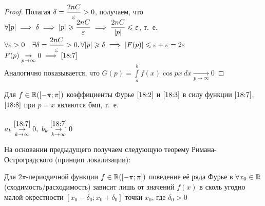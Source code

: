 \documentclass[../../main.tex]{subfiles}
\begin{document}
\begin{proof}
	Полагая $\delta = \dfrac{2nC}{\varepsilon	} > 0$, получаем, что
	$\forall |p| \implies \delta \implies |p| \geqslant
	\dfrac{2nC}{\varepsilon} \implies \dfrac{2nC}{|p|}  \leqslant \varepsilon	$, т.~е. \\
	$\forall \varepsilon	 > 0 \quad \exists \delta = \dfrac{2nC}{\varepsilon} 
	> 0,
	\forall |p| \geqslant \delta \implies |F(p)| \leqslant \varepsilon	 + \varepsilon	 
	= 2\varepsilon	$\\
	$F(p) \underset {p \rightarrow \infty}{\rightarrow} 0 
	\implies \eqref{18:7}$\\
	Аналогично показывается, что
	$G(p) = \int\limits_{a}^{b}{f(x)\cos{px}\ dx}  \underset {p \rightarrow
	 \infty}{\rightarrow} 0 $
\end{proof}

\begin{crl*}
	Для $f \in \mathbb{R}([-\pi; \pi])$ коэффициенты Фурье $\eqref{18:2}$ и
	$\eqref{18:3}$ в силу функции $\eqref{18:7}$, $\eqref{18:8}$ при
	$p=x$ являются бмп, т.~е. \\
	\\$a_k \overset{\eqref{18:7}}{\underset
		{k \rightarrow \infty}{\rightarrow}} 0, \
	b_k \overset{\eqref{18:7}}{\underset
		{k \rightarrow \infty}{\rightarrow}} 0$
\end{crl*}

\begin{rem}
	На основании предыдущего получаем следующую теорему 
	Римана-Остроградского (принцип локализации):
\end{rem}

\begin{thm}
	Для $2\pi$-периодичной функции $f\in \mathbb{R}([-\pi;\pi])$ поведение
	её ряда Фурье в $\forall x_0 \in \mathbb{R}$(сходимость/расходимость) зависит
	лишь от значений $f(x)$ в сколь угодно малой окрестности
	$[x_0 - \delta_0; x_0 + \delta_0]$ точки $x_0$, где $\delta_0 > 0$ 
\end{thm}
\end{document}
